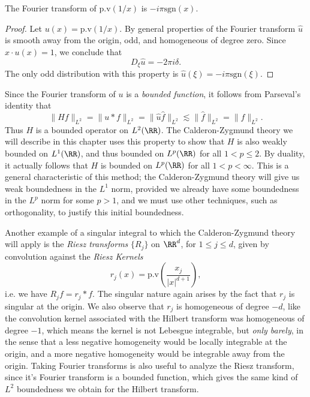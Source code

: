 \begin{lemma}
    The Fourier transform of $\text{p.v}(1/x)$ is $- i \pi \text{sgn}(x)$.
\end{lemma}
\begin{proof}
    Let $u(x) = \text{p.v}(1/x)$. By general properties of the Fourier transform $\widehat{u}$ is smooth away from the origin, odd, and homogeneous of degree zero. Since $x \cdot u(x) = 1$, we conclude that
    \[ D_\xi \widehat{u} = - 2 \pi i \delta. \]
    The only odd distribution with this property is $\widehat{u}(\xi) = - i \pi \text{sgn}(\xi)$.
\end{proof}

Since the Fourier transform of $u$ is a \emph{bounded function}, it follows from Parseval's identity that
%
\[ \| H f \|_{L^2} = \| u * f \|_{L^2} = \| \widehat{u} \widehat{f} \|_{L^2} \lesssim \| \widehat{f} \|_{L^2} = \| f \|_{L^2}. \]
%
Thus $H$ is a bounded operator on $L^2(\RR)$. The Calderon-Zygmund theory we will describe in this chapter uses this property to show that $H$ is also weakly bounded on $L^1(\RR)$, and thus bounded on $L^p(\RR)$ for all $1 < p \leq 2$. By duality, it actually follows that $H$ is bounded on $L^p(\RR)$ for all $1 < p < \infty$. This is a general characteristic of this method; the Calderon-Zygmund theory will give us weak boundedness in the $L^1$ norm, provided we already have some boundedness in the $L^p$ norm for some $p > 1$, and we must use other techniques, such as orthogonality, to justify this initial boundedness.

Another example of a singular integral to which the Calderon-Zygmund theory will apply is the \emph{Riesz transforms} $\{ R_j \}$ on $\RR^d$, for $1 \leq j \leq d$, given by convolution against the \emph{Riesz Kernels}
%
\[ r_j(x) = \text{p.v} \left( \frac{x_j}{|x|^{d+1}} \right), \]
%
i.e. we have $R_j f = r_j * f$. The singular nature again arises by the fact that $r_j$ is singular at the origin. We also observe that $r_j$ is homogeneous of degree $-d$, like the convolution kernel associated with the Hilbert transform was homogeneous of degree $-1$, which means the kernel is not Lebesgue integrable, but \emph{only barely}, in the sense that a less negative homogeneity would be locally integrable at the origin, and a more negative homogeneity would be integrable away from the origin. Taking Fourier transforms is also useful to analyze the Riesz transform, since it's Fourier transform is a bounded function, which gives the same kind of $L^2$ boundedness we obtain for the Hilbert transform.

